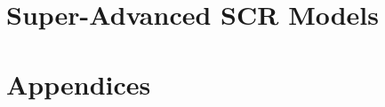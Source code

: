 \documentclass{book}
\begin{document}







\part{Super-Advanced SCR Models}










\part{Appendices}









\end{document}
